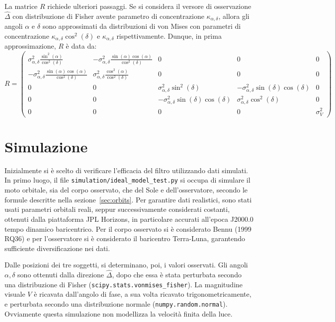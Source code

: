 \documentclass[12pt,a4paper,openright,twoside]{book}
\begin{document}
La matrice $R$ richiede ulteriori passaggi. Se si considera il versore di osservazione $\hat{\Delta}$ con distribuzione di Fisher avente parametro di concentrazione $\kappa_{\alpha,\delta}$, allora gli angoli $\alpha$ e $\delta$ sono approssimati da distribuzioni di von Mises con parametri di concentrazione $\kappa_{\alpha,\delta}\cos^2(\delta)$ e $\kappa_{\alpha,\delta}$ rispettivamente. Dunque, in prima approssimazione, $R$ è data da:
\begin{equation}
R=\left(\begin{smallmatrix}
\sigma_{\alpha,\delta}^2\tfrac{\sin^2(\alpha)}{\cos^2(\delta)} & -\sigma_{\alpha,\delta}^2\tfrac{\sin(\alpha)\cos(\alpha)}{\cos^2(\delta)} & 0 & 0 & 0 \\
-\sigma_{\alpha,\delta}^2\tfrac{\sin(\alpha)\cos(\alpha)}{\cos^2(\delta)} & \sigma_{\alpha,\delta}^2\tfrac{\cos^2(\alpha)}{\cos^2(\delta)} & 0 & 0 & 0 \\
0 & 0 & \sigma_{\alpha,\delta}^2\sin^2(\delta) & -\sigma_{\alpha,\delta}^2\sin(\delta)\cos(\delta) & 0 \\
0 & 0 & -\sigma_{\alpha,\delta}^2\sin(\delta)\cos(\delta) & \sigma_{\alpha,\delta}^2\cos^2(\delta) & 0 \\
0 & 0 & 0 & 0 & \sigma_V^2
\end{smallmatrix}\right)
\end{equation}

\section{Simulazione}

Inizialmente si è scelto di verificare l'efficacia del filtro utilizzando dati simulati. In primo luogo, il file \lstinline{simulation/ideal_model_test.py} si occupa di simulare il moto orbitale, sia del corpo osservato, che del Sole e dell'osservatore, secondo le formule descritte nella sezione~\ref{sec:orbits}. Per garantire dati realistici, sono stati usati parametri orbitali reali, seppur successivamente considerati costanti, ottenuti dalla piattaforma JPL Horizons, in particolare accurati all'epoca J2000.0 tempo dinamico baricentrico. Per il corpo osservato si è considerato Bennu (1999 RQ36) e per l'osservatore si è considerato il baricentro Terra-Luna, garantendo sufficiente diversificazione nei dati.

Dalle posizioni dei tre soggetti, si determinano, poi, i valori osservati. Gli angoli $\alpha,\delta$ sono ottenuti dalla direzione $\hat{\Delta}$, dopo che essa è stata perturbata secondo una distribuzione di Fisher (\lstinline{scipy.stats.vonmises_fisher}). La magnitudine visuale $V$ è ricavata dall'angolo di fase, a sua volta ricavato trigonometricamente, e perturbata secondo una distribuzione normale (\lstinline{numpy.random.normal}). \\
Ovviamente questa simulazione non modellizza la velocità finita della luce. \\
\end{document}
